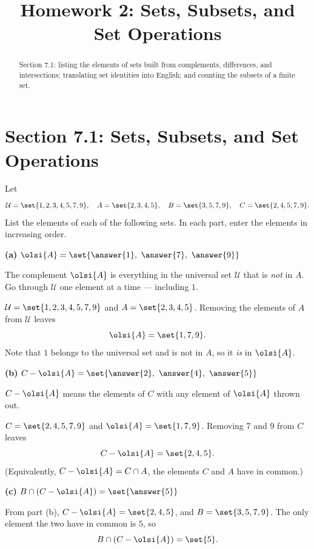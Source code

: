 \documentclass[12pt]{ximera}
\title{Homework 2: Sets, Subsets, and Set Operations}
\begin{document}
\begin{abstract}
Section 7.1: listing the elements of sets built from complements, differences, and
intersections; translating set identities into English; and counting the subsets of
a finite set.
\end{abstract}
\maketitle

\section*{Section 7.1: Sets, Subsets, and Set Operations}

\begin{problem}
Let
\[
\mathcal{U}=\set{1,2,3,4,5,7,9}, \quad
A=\set{2,3,4,5}, \quad
B=\set{3,5,7,9}, \quad
C=\set{2,4,5,7,9}.
\]
List the elements of each of the following sets. In each part, enter the elements in
increasing order.

\begin{prompt}
\textbf{(a)} $\olsi{A} = \set{\answer{1},\ \answer{7},\ \answer{9}}$

\begin{hint}
The complement $\olsi{A}$ is everything in the universal set $\mathcal{U}$ that is
\emph{not} in $A$. Go through $\mathcal{U}$ one element at a time --- including
$1$.
\end{hint}

\begin{feedback}
$\mathcal{U}=\set{1,2,3,4,5,7,9}$ and $A=\set{2,3,4,5}$. Removing the elements of
$A$ from $\mathcal{U}$ leaves
\[ \olsi{A} = \set{1,7,9}. \]
Note that $1$ belongs to the universal set and is not in $A$, so it \emph{is} in
$\olsi{A}$.
\end{feedback}
\end{prompt}

\begin{prompt}
\textbf{(b)} $C - \olsi{A} = \set{\answer{2},\ \answer{4},\ \answer{5}}$

\begin{hint}
$C-\olsi{A}$ means the elements of $C$ with any element of $\olsi{A}$ thrown out.
\end{hint}

\begin{feedback}
$C=\set{2,4,5,7,9}$ and $\olsi{A}=\set{1,7,9}$. Removing $7$ and $9$ from $C$ leaves
\[ C-\olsi{A} = \set{2,4,5}. \]
(Equivalently, $C-\olsi{A}=C\cap A$, the elements $C$ and $A$ have in common.)
\end{feedback}
\end{prompt}

\begin{prompt}
\textbf{(c)} $B\cap\left(C - \olsi{A}\right) = \set{\answer{5}}$

\begin{feedback}
From part (b), $C-\olsi{A}=\set{2,4,5}$, and $B=\set{3,5,7,9}$. The only element the
two have in common is $5$, so
\[ B\cap\left(C-\olsi{A}\right)=\set{5}. \]
\end{feedback}
\end{prompt}
\end{problem}
\end{document}
